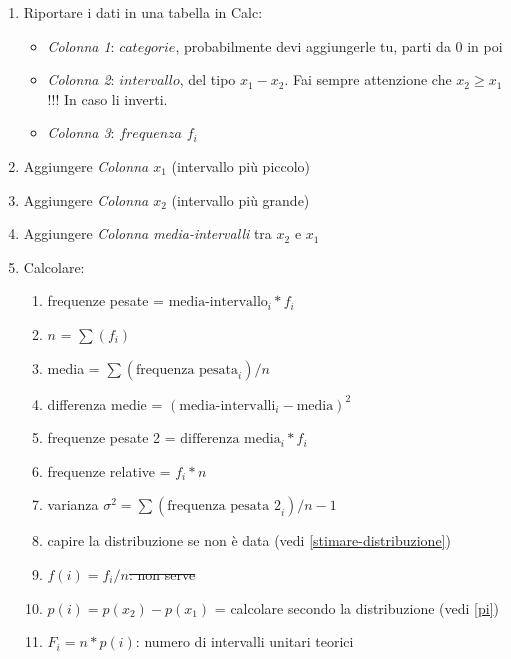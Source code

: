 \begin{enumerate}
      \item Riportare i dati in una tabella in Calc:
            \begin{itemize}
                  \item \textit{Colonna 1}: $categorie$, probabilmente devi
                        aggiungerle tu, parti da 0 in poi
                  \item \textit{Colonna 2}: $intervallo$, del tipo $x_1 - x_2$.
                        Fai sempre attenzione che $x_2 \ge x_1$ !!! In caso li
                        inverti.
                  \item  \textit{Colonna 3}: $frequenza$ $f_i$
            \end{itemize}
      \item Aggiungere \textit{Colonna $x_1$} (intervallo più piccolo)
      \item Aggiungere \textit{Colonna $x_2$} (intervallo più grande)
      \item Aggiungere \textit{Colonna media-intervalli} tra \textit{$x_2$} e
            \textit{$x_1$}
      \item Calcolare:
            \begin{enumerate}
                  \item frequenze pesate = $\text{media-intervallo}_i * f_i$
                  \item $n$ = $\sum(f_i)$
                  \item media = $\sum(\text{frequenza pesata}_i)/n$
                  \item differenza medie = $(\text{media-intervalli}_i -
                              \text{media})^2$
                  \item frequenze pesate 2 = $\text{differenza media}_i * f_i$
                  \item frequenze relative = $f_i * n$
                  \item varianza $\sigma^2 = \sum(\text{frequenza pesata 2}_i) /
                              n - 1$
                  \item capire la distribuzione se non è data (vedi
                        \ref{stimare-distribuzione})
                  \item \st{$f(i) = f_i / n$: non serve}
                  \item $p(i) = p(x_2) - p(x_1)$ = calcolare secondo la distribuzione (vedi \ref{pi})
                  \item $F_i = n * p(i)$: numero di intervalli unitari teorici

\end{enumerate}
\end{enumerate}

